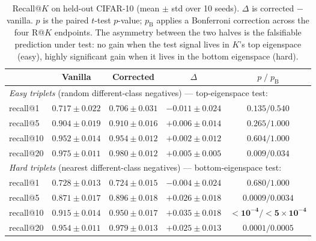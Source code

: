 \documentclass{article}
\begin{document}
\begin{table}[!htbp]
\centering
\caption{Recall@$K$ on held-out CIFAR-10 (mean $\pm$ std over 10
seeds). $\Delta$ is corrected $-$ vanilla. $p$ is the paired $t$-test
$p$-value; $p_{\text{B}}$ applies a Bonferroni correction across the
four R@$K$ endpoints. The asymmetry between the two halves is the
falsifiable prediction under test: no gain when the test signal lives in $K$'s top
eigenspace (easy), highly significant gain when it lives in the bottom
eigenspace (hard).}
\label{tab:recall}
\begin{tabular}{lcccc}
\toprule
& Vanilla & Corrected & $\Delta$ & $p \;/\; p_{\text{B}}$ \\
\midrule
\multicolumn{5}{l}{\emph{Easy triplets} (random different-class negatives) --- top-eigenspace test:} \\
recall@1  & $0.717 \pm 0.022$ & $0.706 \pm 0.031$ & $-0.011 \pm 0.024$ & $0.135 / 0.540$ \\
recall@5  & $0.904 \pm 0.019$ & $0.910 \pm 0.016$ & $+0.006 \pm 0.014$ & $0.265 / 1.000$ \\
recall@10 & $0.952 \pm 0.014$ & $0.954 \pm 0.012$ & $+0.002 \pm 0.012$ & $0.604 / 1.000$ \\
recall@20 & $0.975 \pm 0.011$ & $0.980 \pm 0.012$ & $+0.005 \pm 0.005$ & $0.009 / 0.034$ \\
\midrule
\multicolumn{5}{l}{\emph{Hard triplets} (nearest different-class negatives) --- bottom-eigenspace test:} \\
recall@1  & $0.728 \pm 0.013$ & $0.724 \pm 0.015$ & $-0.004 \pm 0.024$ & $0.680 / 1.000$ \\
recall@5  & $0.871 \pm 0.017$ & $0.896 \pm 0.018$ & $\mathbf{+0.026 \pm 0.018}$ & $\mathbf{0.0009 / 0.0034}$ \\
recall@10 & $0.915 \pm 0.014$ & $0.950 \pm 0.017$ & $\mathbf{+0.035 \pm 0.018}$ & $\mathbf{< 10^{-4} / < 5 \times 10^{-4}}$ \\
recall@20 & $0.954 \pm 0.011$ & $0.979 \pm 0.013$ & $\mathbf{+0.025 \pm 0.013}$ & $\mathbf{0.0001 / 0.0005}$ \\
\bottomrule
\end{tabular}
\end{table}
\end{document}
